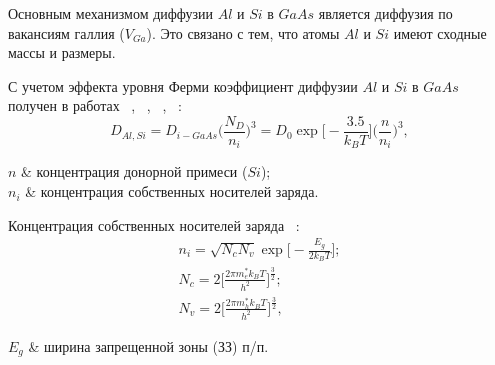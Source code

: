 Основным механизмом диффузии $Al$ и $Si$ в $GaAs$ является диффузия по вакансиям галлия ($V_{Ga}$). Это связано с тем, что атомы $Al$ и $Si$ имеют сходные массы и размеры. 

С учетом эффекта уровня Ферми коэффициент диффузии $Al$ и $Si$ в $GaAs$ получен в работах ~\cite{getMeshkov}, ~\cite{Meshkov}, ~\cite{Meshkov}, ~\cite{Makeev}:
\begin{equation}
	D_{Al,Si} = D_{i-GaAs}\Big( \frac{N_{D}}{n_{i}} \Big)^{3} = D_{0}\exp\bigg[-\frac{3.5}{k_{B}T}\bigg]\Big( \frac{n}{n_{i}} \Big)^{3},
\end{equation}
\begin{conditions}
	$n$ & концентрация донорной примеси ($Si$);\\
	$n_{i}$ & концентрация собственных носителей заряда.
\end{conditions}

Концентрация собственных носителей заряда ~\cite{MFTIne}:
\begin{gather}
	n_{i} = \sqrt{N_{c}N_{v}}\exp\!\bigg[ - \frac{E_{g}}{2k_{B}T} \bigg];\\
	N_{c} = 2\Big[ \frac{2\pi m_{e}^{\ast}k_{B}T}{h^{2}} \Big]^{\frac{3}{2}};\\
	N_{v} = 2\Big[ \frac{2\pi m_{h}^{\ast}k_{B}T}{h^{2}} \Big]^{\frac{3}{2}},
\end{gather}
\begin{conditions}
	$E_{g}$ & ширина запрещенной зоны (ЗЗ) п/п.
\end{conditions}





